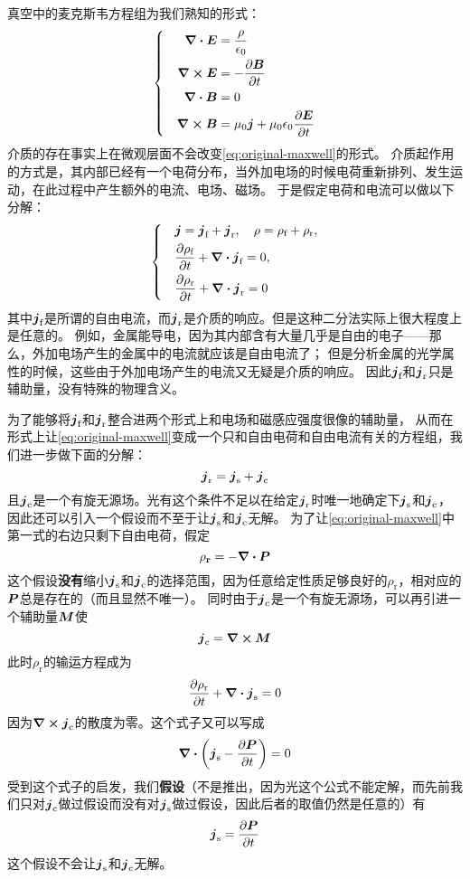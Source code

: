 \documentclass[UTF8, a4paper]{ctexart}
\newenvironment{bigcase}{\left\{\quad\begin{aligned}}{\end{aligned}\right.}
\begin{document}
真空中的麦克斯韦方程组为我们熟知的形式：
\begin{equation}
    \begin{bigcase}
        \div{\vb*{E}} &= \frac{\rho}{\epsilon_0} \\
        \curl{\vb*{E}} &= - \pdv{\vb*{B}}{t} \\
        \div{\vb*{B}} &= 0 \\
        \curl{\vb*{B}} &= \mu_0 \vb*{j} + \mu_0 \epsilon_0 \pdv{\vb*{E}}{t}
    \end{bigcase}
    \label{eq:original-maxwell}
\end{equation}
介质的存在事实上在微观层面不会改变\eqref{eq:original-maxwell}的形式。
介质起作用的方式是，其内部已经有一个电荷分布，当外加电场的时候电荷重新排列、发生运动，在此过程中产生额外的电流、电场、磁场。
于是假定电荷和电流可以做以下分解：
\[
    \begin{bigcase}
        &\vb*{j} = \vb*{j}_\text{f} + \vb*{j}_\text{r}, \quad \rho = \rho_\text{f} + \rho_\text{r}, \\
        &\pdv{\rho_\text{f}}{t} + \div{\vb*{j}_\text{f}} = 0, \\
        &\pdv{\rho_\text{r}}{t} + \div{\vb*{j}_\text{r}} = 0
    \end{bigcase}
\]
其中$\vb*{j}_\text{f}$是所谓的自由电流，而$\vb*{j}_\text{r}$是介质的响应。但是这种二分法实际上很大程度上是任意的。
例如，金属能导电，因为其内部含有大量几乎是自由的电子——那么，外加电场产生的金属中的电流就应该是自由电流了；
但是分析金属的光学属性的时候，这些由于外加电场产生的电流又无疑是介质的响应。
因此$\vb*{j}_\text{f}$和$\vb*{j}_\text{r}$只是辅助量，没有特殊的物理含义。

为了能够将$\vb*{j}_\text{f}$和$\vb*{j}_\text{r}$整合进两个形式上和电场和磁感应强度很像的辅助量，
从而在形式上让\eqref{eq:original-maxwell}变成一个只和自由电荷和自由电流有关的方程组，我们进一步做下面的分解：
\[
    \vb*{j}_\text{r} = \vb*{j}_\text{s} + \vb*{j}_\text{c}
\]
且$\vb*{j}_\text{c}$是一个有旋无源场。光有这个条件不足以在给定$\vb*{j}_\text{r}$时唯一地确定下$\vb*{j}_\text{s}$和$\vb*{j}_\text{c}$，
因此还可以引入一个假设而不至于让$\vb*{j}_\text{s}$和$\vb*{j}_\text{c}$无解。
为了让\eqref{eq:original-maxwell}中第一式的右边只剩下自由电荷，假定
\[
    \rho_\textbf{r} = - \div{\vb*{P}}
\]
这个假设\textbf{没有}缩小$\vb*{j}_\text{s}$和$\vb*{j}_\text{c}$的选择范围，因为任意给定性质足够良好的$\rho_\text{r}$，相对应的$\vb*{P}$总是存在的（而且显然不唯一）。
同时由于$\vb*{j}_\text{c}$是一个有旋无源场，可以再引进一个辅助量$\vb*{M}$使
\[
    \vb*{j}_\text{c} = \curl{\vb*{M}}
\]
此时$\rho_\text{r}$的输运方程成为
\[
    \pdv{\rho_\text{r}}{t} + \div{\vb*{j}_\text{s}} = 0
\]
因为$\curl{\vb*{j}_\text{c}}$的散度为零。这个式子又可以写成
\[
    \div{\left(\vb*{j}_\text{s}-\pdv{\vb*{P}}{t}\right)} = 0
\]
受到这个式子的启发，我们\textbf{假设}（不是推出，因为光这个公式不能定解，而先前我们只对$\vb*{j}_\text{c}$做过假设而没有对$\vb*{j}_\text{s}$做过假设，因此后者的取值仍然是任意的）有
\[
    \vb*{j}_\text{s} = \pdv{\vb*{P}}{t}
\]
这个假设不会让$\vb*{j}_\text{s}$和$\vb*{j}_\text{c}$无解。
\end{document}
